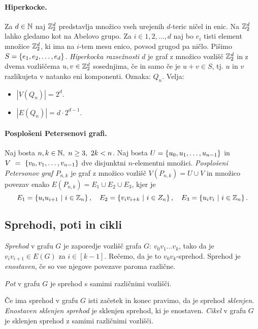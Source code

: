 \paragraph{Hiperkocke.} Za $d \in \mathbb{N}$ naj $\mathbb{Z}_2^d$ predstavlja množico vseh urejenih $d$-teric ničel in enic. Na $\mathbb{Z}_2^d$ lahko gledamo kot na Abelovo grupo. Za $i \in {1, 2, \ldots, d}$ naj bo $e_i$ tisti element množice $\mathbb{Z}_2^d$, ki ima na $i$-tem mesu enico, povsod grugod pa ničlo. Pišimo $S = \left\{e_1, e_2, \ldots, e_d\right\}$. \emph{Hiperkocka razsežnosti $d$} je graf z množico vozlišč $\mathbb{Z}_2^d$ in z dvema vozliščema $u, v \in \mathbb{Z}_2^d$ sosednjima, če in samo če je $u+ v \in S$, tj. $u$ in $v$ razlikujeta v natanko eni komponenti. Oznaka: $Q_n$. Velja:
\begin{itemize}
    \item $|V(Q_n)| = 2^d$.
    \item $|E(Q_n)| = d \cdot 2 ^{d-1}$.
\end{itemize}

\paragraph{Posplošeni Petersenovi grafi.} Naj bosta $n, k \in \mathbb{N}, \ n \geq 3, \ 2k < n$. Naj bosta $U = \left\{u_0, u_1, \ldots, u_{n-1}\right\}$ in $V~=~\left\{v_0, v_1, \ldots, v_{n-1}\right\}$ dve disjunktni $n$-elementni množici. \emph{Posplošeni Petersonov graf $P_{n,k}$} je graf z množico vozlišč $V(P_{n,k}) = U \cup V$ in množico povezav enako $E(P_{n,k}) = E_1 \cup E_2 \cup E_3$, kjer je 
$$E_1 = \left\{u_iu_{i+1} \ | \ i \in \mathbb{Z}_n\right\}, \quad E_2 = \left\{v_iv_{i+k} \ | \ i \in Z_n\right\}, \quad E_3 = \left\{u_iv_i \ | \ i \in \mathbb{Z}_n\right\}.$$

\subsection{Sprehodi, poti in cikli}
\begin{definicija}
    \emph{Sprehod} v grafu $G$ je zaporedje vozlišč grafa $G$: $v_0v_1\ldots v_k$, tako da je $v_iv_{i+1} \in E(G)$ za $i \in [k-1]$. Rečemo, da je to $v_0v_k$-sprehod. Sprehod je \emph{enostaven}, če so vse njegove povezave paroma različne.
\end{definicija}

\begin{definicija}
    \emph{Pot} v grafu $G$ je sprehod s samimi različnimi vozlišči.
\end{definicija}

\begin{definicija}
    Če ima sprehod v grafu $G$ isti začetek in konec pravimo, da je sprehod \emph{sklenjen}. \emph{Enostaven sklenjen sprehod} je sklenjen sprehod, ki je enostaven. \emph{Cikel} v grafu $G$ je sklenjen sprehod z samimi različnimi vozlišči.
\end{definicija}

